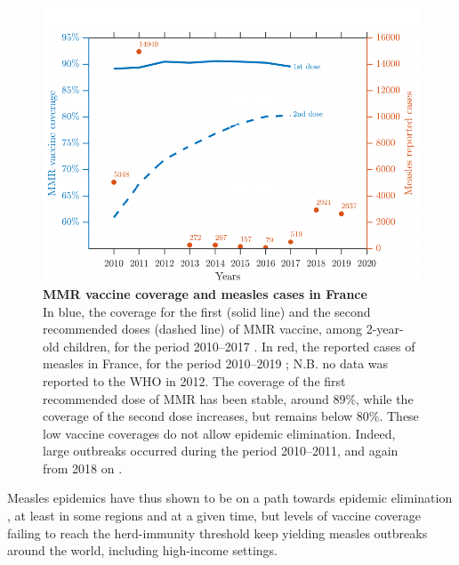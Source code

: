 
\begin{figure}[H]
	\centering
	\includegraphics{Figures/Vaccine/Measles_FR}
	\captionsetup{width=0.85\textwidth}
	\caption[MMR vaccine coverage and measles cases in France]{%
		{\bf MMR vaccine coverage and measles cases in France}\\
	In blue, the coverage for the first (solid line) and the second recommended doses (dashed line) of MMR vaccine, among 2-year-old children, for the period 2010--2017 \cite[]{SPF_CouvertureROR2019}. In red, the reported cases of measles in France, for the period 2010--2019 \cite[]{WHO_MeaslesFrance2020}; N.B. no data was reported to the WHO in 2012. The coverage of the first  recommended dose of MMR has been stable, around 89\%, while the coverage of the second dose increases, but remains below 80\%. These low vaccine coverages do not allow epidemic elimination. Indeed, large outbreaks occurred during the period 2010--2011, and again from 2018 on \cite[]{WHO_MeaslesFrance2020}.}
	\label{fig:Measles_France}
\end{figure}

Measles epidemics have thus shown to be on a path towards epidemic elimination \cite{Graham2019}, at least in some regions and at a given time, but levels of vaccine coverage failing to reach the herd-immunity threshold keep yielding measles outbreaks around the world, including high-income settings. %

